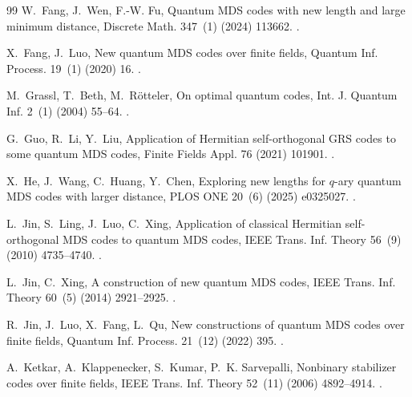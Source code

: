 \documentclass[preprint,12pt,a4paper]{elsarticle}
\begin{document}
\begin{thebibliography}{99}
W.~Fang, J.~Wen, F.-W. Fu, Quantum {MDS} codes with new length and large
  minimum distance, Discrete Math. 347~(1) (2024) 113662.
\newblock \href {https://doi.org/10.1016/j.disc.2023.113662}
  {}.

X.~Fang, J.~Luo, New quantum {MDS} codes over finite fields, Quantum Inf. Process. 19~(1) (2020) 16.
\newblock \href {https://doi.org/10.1007/s11128-019-2506-0}
  {}.

M.~Grassl, T.~Beth, M.~R{\"o}tteler, On optimal quantum codes, Int. J. Quantum Inf. 2~(1) (2004) 55--64.
\newblock \href {https://doi.org/10.1142/S0219749904000079}
  {}.

G.~Guo, R.~Li, Y.~Liu, Application of {Hermitian} self-orthogonal {GRS} codes
  to some quantum {MDS} codes, Finite Fields Appl. 76 (2021)
  101901.
\newblock \href {https://doi.org/10.1016/j.ffa.2021.101901}
  {}.

X.~He, J.~Wang, C.~Huang, Y.~Chen, Exploring new lengths for $q$-ary quantum
  {MDS} codes with larger distance, PLOS ONE 20~(6) (2025) e0325027.
\newblock \href {https://doi.org/10.1371/journal.pone.0325027}
  {}.

L.~Jin, S.~Ling, J.~Luo, C.~Xing, Application of classical {Hermitian}
  self-orthogonal {MDS} codes to quantum {MDS} codes, IEEE Trans. Inf. Theory 56~(9) (2010) 4735--4740.
\newblock \href {https://doi.org/10.1109/TIT.2010.2054174}
  {}.

L.~Jin, C.~Xing, A construction of new quantum {MDS} codes, IEEE Trans. Inf. Theory 60~(5) (2014) 2921--2925.
\newblock \href {https://doi.org/10.1109/TIT.2014.2299800}
  {}.

R.~Jin, J.~Luo, X.~Fang, L.~Qu, New constructions of quantum {MDS} codes over
  finite fields, Quantum Inf. Process. 21~(12) (2022) 395.
\newblock \href {https://doi.org/10.1007/s11128-022-03742-z}
  {}.

A.~Ketkar, A.~Klappenecker, S.~Kumar, P.~K. Sarvepalli, Nonbinary stabilizer
  codes over finite fields, IEEE Trans. Inf. Theory 52~(11)
  (2006) 4892--4914.
\newblock \href {https://doi.org/10.1109/TIT.2006.883612}
  {}.


\end{thebibliography}
\end{document}
